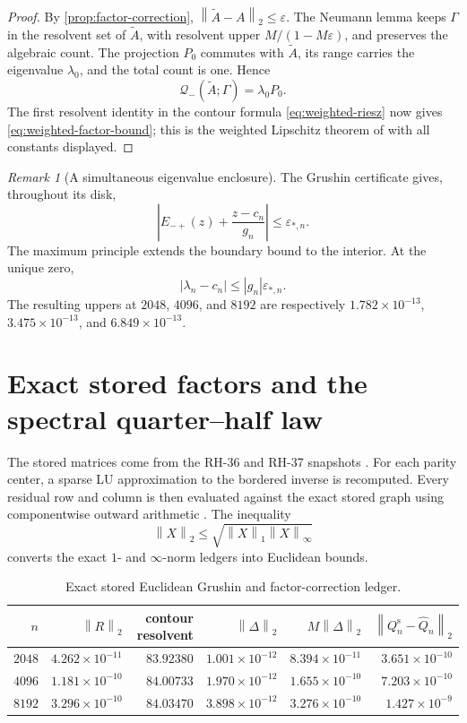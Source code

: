 \documentclass[11pt]{article}
\theoremstyle{definition}
\theoremstyle{remark}
\newtheorem{remark}[theorem]{Remark}
\newcommand{\cQ}{\mathcal Q}
\newcommand{\norm}[1]{\left\lVert #1\right\rVert}
\begin{document}
\begin{proof}
By \cref{prop:factor-correction},
$\norm{\widetilde A-A}_2\le\varepsilon$.  The Neumann lemma keeps
$\Gamma$ in the resolvent set of $\widetilde A$, with resolvent upper
$M/(1-M\varepsilon)$, and preserves the algebraic count.  The projection
$P_0$ commutes with $\widetilde A$, its range carries the eigenvalue
$\lambda_0$, and the total count is one.  Hence
\[
 \cQ_-(\widetilde A;\Gamma)=\lambda_0P_0.
\]
The first resolvent identity in the contour formula
\eqref{eq:weighted-riesz} now gives \eqref{eq:weighted-factor-bound}; this is
the weighted Lipschitz theorem of \citet{WangRiesz2026} with all constants
displayed.
\end{proof}

\begin{remark}[A simultaneous eigenvalue enclosure]
The Grushin certificate gives, throughout its disk,
\[
 \left|E_{-+}(z)+\frac{z-c_n}{g_n}\right|\le\varepsilon_{*,n}.
\]
The maximum principle extends the boundary bound to the interior.  At the
unique zero,
\[
 |\lambda_n-c_n|\le |g_n|\varepsilon_{*,n}.
\]
The resulting uppers at $2048$, $4096$, and $8192$ are respectively
$1.782\times10^{-13}$, $3.475\times10^{-13}$, and
$6.849\times10^{-13}$.
\end{remark}

\section{Exact stored factors and the spectral quarter--half law}
\label{sec:stored}

The stored matrices come from the RH-36 and RH-37 snapshots
\citep{WangNested2026,WangIterated2026}.  For each parity center, a sparse
LU approximation to the bordered inverse is recomputed.  Every residual row
and column is then evaluated against the exact stored graph using
componentwise outward arithmetic \citep{Rump2010,WangOutward2026}.  The
inequality
\[
 \norm X_2\le\sqrt{\norm X_1\norm X_\infty}
\]
converts the exact $1$- and $\infty$-norm ledgers into Euclidean bounds.

\begin{table}[H]
\centering
\caption{Exact stored Euclidean Grushin and factor-correction ledger.}
\label{tab:stored-ledger}
\small
\begin{tabular}{@{}rrrrrr@{}}
\toprule
$n$ & $\norm R_2$ & contour resolvent
& $\norm\Delta_2$ & $M\norm\Delta_2$
& $\norm{Q_n^{\mathrm s}-\widehat Q_n}_2$\\
\midrule
$2048$ & $4.262{\times}10^{-11}$ & $83.92380$
& $1.001{\times}10^{-12}$ & $8.394{\times}10^{-11}$
& $3.651{\times}10^{-10}$\\
$4096$ & $1.181{\times}10^{-10}$ & $84.00733$
& $1.970{\times}10^{-12}$ & $1.655{\times}10^{-10}$
& $7.203{\times}10^{-10}$\\
$8192$ & $3.296{\times}10^{-10}$ & $84.03470$
& $3.898{\times}10^{-12}$ & $3.276{\times}10^{-10}$
& $1.427{\times}10^{-9}$\\
\bottomrule
\end{tabular}
\end{table}
\end{document}

